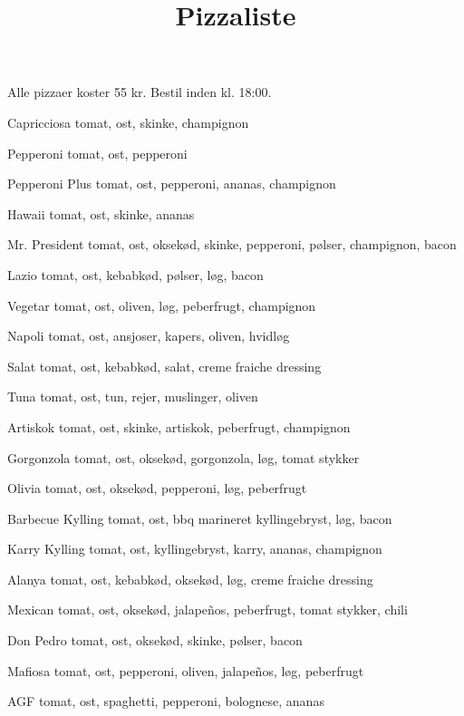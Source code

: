 

\title{Pizzaliste}
\date{}


\maketitle


Alle pizzaer koster 55 kr. Bestil inden kl. 18:00.

\begin{enumdescription}
\item[Capricciosa] tomat, ost, skinke, champignon
\item[Pepperoni] tomat, ost, pepperoni
\item[Pepperoni Plus] tomat, ost, pepperoni, ananas, champignon
\item[Hawaii] tomat, ost, skinke, ananas
\item[Mr. President] tomat, ost, oksekød, skinke, pepperoni, pølser,
  champignon, bacon
\item[Lazio] tomat, ost, kebabkød, pølser, løg, bacon
\item[Vegetar] tomat, ost, oliven, løg, peberfrugt, champignon
\item[Napoli] tomat, ost, ansjoser, kapers, oliven, hvidløg
\item[Salat] tomat, ost, kebabkød, salat, creme fraiche dressing
\item[Tuna] tomat, ost, tun, rejer, muslinger, oliven
\item[Artiskok] tomat, ost, skinke, artiskok, peberfrugt, champignon
\item[Gorgonzola] tomat, ost, oksekød, gorgonzola, løg, tomat stykker
\item[Olivia] tomat, ost, oksekød, pepperoni, løg, peberfrugt
\item[Barbecue Kylling] tomat, ost, bbq marineret kyllingebryst, løg,
  bacon
\item[Karry Kylling] tomat, ost, kyllingebryst, karry, ananas,
  champignon
\item[Alanya] tomat, ost, kebabkød, oksekød, løg, creme fraiche dressing
\item[Mexican] tomat, ost, oksekød, jalapeños, peberfrugt, tomat
  stykker, chili
\item[Don Pedro] tomat, ost, oksekød, skinke, pølser, bacon
\item[Mafiosa] tomat, ost, pepperoni, oliven, jalapeños, løg,
  peberfrugt
\item[AGF] tomat, ost, spaghetti, pepperoni, bolognese, ananas

\end{enumdescription}
